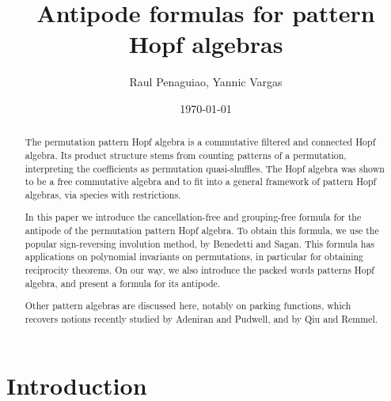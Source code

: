 \documentclass[12pt, reqno]{amsart}
\theoremstyle{definition}
\begin{document}
\title{Antipode formulas for pattern Hopf algebras} %



\author{Raul Penaguiao, Yannic Vargas}
\address{San Francisco State University}
\address{Technische Universit\"at Graz}
\date{\today} %

\begin{abstract}
The permutation pattern Hopf algebra is a commutative filtered and connected Hopf algebra.
Its product structure stems from counting patterns of a permutation, interpreting the coefficients as permutation quasi-shuffles.
The Hopf algebra was shown to be a free commutative algebra and to fit into a general framework of pattern Hopf algebras, via species with restrictions.

In this paper we introduce the cancellation-free and grouping-free formula for the antipode of the permutation pattern Hopf algebra.
To obtain this formula, we use the popular sign-reversing involution method, by Benedetti and Sagan.
This formula has applications on polynomial invariants on permutations, in particular for obtaining reciprocity theorems.
On our way, we also introduce the packed words patterns Hopf algebra, and present a formula for its antipode.

Other pattern algebras are discussed here, notably on parking functions, which recovers notions recently studied by Adeniran and Pudwell, and by Qiu and Remmel.
\end{abstract}


\maketitle

\tableofcontents

\section{Introduction}
\end{document}
